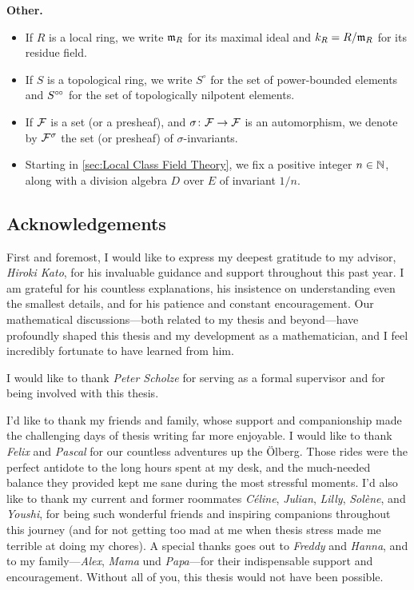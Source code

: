 \documentclass[../main.tex]{subfiles}
\begin{document}
\textbf{Other.}\vspace{-1em}
\begin{itemize}
  \item If $R$ is a local ring, we write $\mathfrak{m}_R$ for its maximal ideal and 
    $k_R = R/\mathfrak{m}_R$ for its residue field. 
  \item If $S$ is a topological ring, we write $S^\circ$ for the set of power-bounded
    elements and $S^{\circ \hspace{-0.5pt} \circ}$ for the set of topologically nilpotent elements.
  \item If $\mathcal{F}$ is a set (or a presheaf), and $\sigma\colon \mathcal{F} \to \mathcal{F}$ is an
    automorphism, we denote by $\mathcal{F}^\sigma$ the set (or presheaf) of 
    $\sigma$-invariants.
  \item Starting in \cref{sec:Local Class Field Theory}, we fix a positive
    integer $n \in \mathbb{N}$, along with a division algebra $D$ over $E$ of invariant $1/n$. 
\end{itemize}


\subsection*{Acknowledgements} %
First and foremost, I would like to express my deepest gratitude to my advisor,
\textit{Hiroki Kato}, for his invaluable guidance and support throughout this
past year. I am grateful for his countless explanations, his insistence on
understanding even the smallest details, and for his patience and constant
encouragement. Our mathematical discussions—both related to my thesis and
beyond—have profoundly shaped this thesis and my development as a
mathematician, and I feel incredibly fortunate to have learned from him.

I would like to thank \textit{Peter Scholze} for serving as a formal
supervisor and for being involved with this thesis.

I'd like to thank my friends and family, whose support and
companionship made the challenging days of thesis writing far more enjoyable. I
would like to thank \textit{Felix} and \textit{Pascal} for our countless
adventures up the Ölberg. Those rides were the perfect antidote to the long
hours spent at my desk, and the much-needed balance they provided kept me sane
during the most stressful moments. I'd also like to thank my current and former
roommates \textit{C\'eline}, \textit{Julian}, \textit{Lilly}, \textit{Solène},
and \textit{Youshi}, for being such wonderful friends and inspiring companions
throughout this
journey (and for not getting too mad at me when thesis stress made me terrible
at doing my chores). A special thanks goes out to \textit{Freddy} and
\textit{Hanna}, and to my family—\textit{Alex}, \textit{Mama} und
\textit{Papa}—for their indispensable support and encouragement.
Without all of you, this thesis would not have been possible. 
\end{document}
